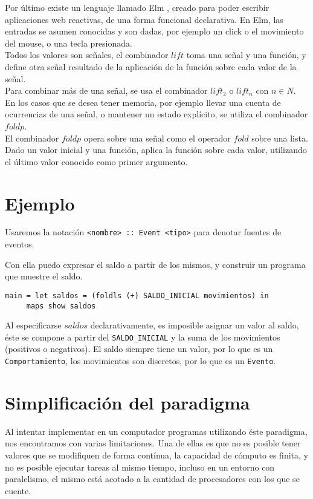   
  Por último existe un lenguaje llamado Elm \cite{evanczaplicki2012:Elm}, creado para
poder escribir aplicaciones web reactivas, de una forma funcional declarativa.
  En Elm, las entradas se asumen conocidas y son dadas, por ejemplo un click o el movimiento del mouse,
o una tecla presionada.\\
  Todos los valores son señales, el combinador $lift$
toma una señal y una función, y define otra señal resultado de la aplicación de la función
sobre cada valor de la señal.\\
  Para combinar más de una señal, se usa el combinador $lift_2$ o $lift_n$ con $n \in N$.\\
  En los casos que se desea tener memoria, por ejemplo llevar una cuenta de ocurrencias
  de una señal, o mantener un estado explícito, se utiliza el combinador $foldp$.\\

  El combinador $foldp$ opera sobre una señal como el operador $fold$ sobre una lista. Dado
un valor inicial y una función, aplica la función sobre cada valor, utilizando el último
valor conocido como primer argumento.


\section{Ejemplo}

  Usaremos la notación \texttt{<nombre> :: Event <tipo>} para denotar
fuentes de eventos.

  Con ella puedo expresar el saldo a partir de los mismos, y construir
un programa que muestre el saldo.

\begin{verbatim}
main = let saldos = (foldls (+) SALDO_INICIAL movimientos) in
     maps show saldos
\end{verbatim}

  Al especificarse $saldos$ declarativamente, es imposible asignar un valor al saldo,
éste se compone a partir del \texttt{SALDO\_INICIAL} y la suma de
los movimientos (positivos o negativos).
  El saldo siempre tiene un valor, por lo que es un \texttt{Comportamiento}, los movimientos
son discretos, por lo que es un \texttt{Evento}.

\section{Simplificación del paradigma}

  Al intentar implementar en un computador programas utilizando éste paradigma, nos encontramos
con varias limitaciones.
  Una de ellas es que no es posible tener valores que se modifiquen de forma contínua, la capacidad
de cómputo es finita, y no es posible ejecutar tareas al mismo tiempo, incluso en un entorno con
paralelismo, el mismo está acotado a la cantidad de procesadores con los que se cuente.\\

